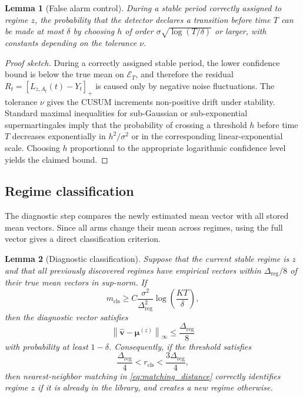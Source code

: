\documentclass[11pt]{article}
\newtheorem{lemma}{Lemma}
\newcommand{\norm}[1]{\left\lVert #1 \right\rVert}
\newcommand{\pos}[1]{\left[#1\right]_{+}}
\begin{document}
\begin{lemma}[False alarm control]
\label{lem:false_alarm}
During a stable period correctly assigned to regime $z$, the probability that the detector declares a transition before time $T$ can be made at most $\delta$ by choosing $h$ of order $\sigma\sqrt{\log(T/\delta)}$ or larger, with constants depending on the tolerance $\nu$.
\end{lemma}

\begin{proof}[Proof sketch]
During a correctly assigned stable period, the lower confidence bound is below the true mean on $\mathcal E_T$, and therefore the residual $R_t=\pos{L_{z,A_t}(t)-Y_t}$ is caused only by negative noise fluctuations. The tolerance $\nu$ gives the CUSUM increments non-positive drift under stability. Standard maximal inequalities for sub-Gaussian or sub-exponential supermartingales imply that the probability of crossing a threshold $h$ before time $T$ decreases exponentially in $h^2/\sigma^2$ or in the corresponding linear-exponential scale. Choosing $h$ proportional to the appropriate logarithmic confidence level yields the claimed bound.
\end{proof}

\subsection{Regime classification}
\label{subsec:classification_proof}

The diagnostic step compares the newly estimated mean vector with all stored mean vectors. Since all arms change their mean across regimes, using the full vector gives a direct classification criterion.

\begin{lemma}[Diagnostic classification]
\label{lem:diagnostic_classification}
Suppose that the current stable regime is $z$ and that all previously discovered regimes have empirical vectors within $\Delta_{\mathrm{reg}}/8$ of their true mean vectors in sup-norm. If
\begin{equation}
\label{eq:m_cls_requirement}
m_{\mathrm{cls}}
\geq
C
\frac{\sigma^2}{\Delta_{\mathrm{reg}}^2}
\log\left(\frac{KT}{\delta}\right),
\end{equation}
then the diagnostic vector satisfies
\begin{equation}
\label{eq:diagnostic_concentration}
\norm{\widehat{\bm v}-\bm\mu^{(z)}}_{\infty}
\leq
\frac{\Delta_{\mathrm{reg}}}{8}
\end{equation}
with probability at least $1-\delta$. Consequently, if the threshold satisfies
\begin{equation}
\label{eq:r_cls_choice}
\frac{\Delta_{\mathrm{reg}}}{4}
<
r_{\mathrm{cls}}
<
\frac{3\Delta_{\mathrm{reg}}}{4},
\end{equation}
then nearest-neighbor matching in \eqref{eq:matching_distance} correctly identifies regime $z$ if it is already in the library, and creates a new regime otherwise.
\end{lemma}
\end{document}
